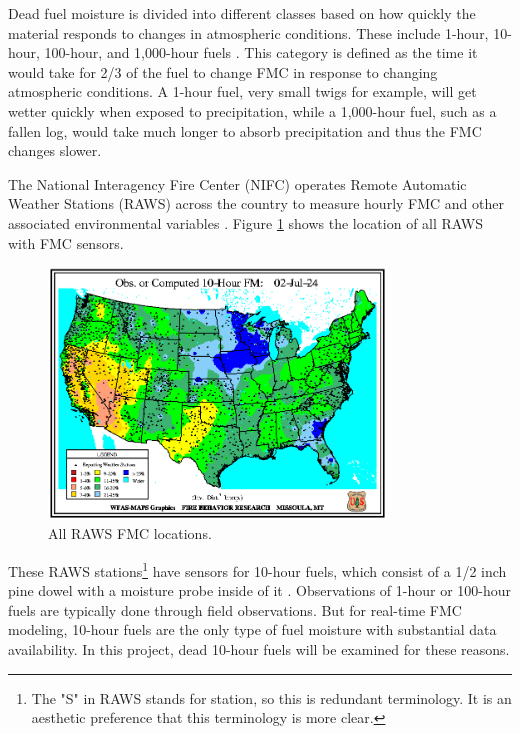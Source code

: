 \documentclass[11pt]{article}%
\begin{document}
Dead fuel moisture is divided into different classes based on how quickly the material responds to changes in atmospheric conditions. These include 1-hour, 10-hour, 100-hour, and 1,000-hour fuels \cite{NCEI-2024-DFM}. This category is defined as the time it would take for 2/3 of the fuel to change FMC in response to changing atmospheric conditions. A 1-hour fuel, very small twigs for example, will get wetter quickly when exposed to precipitation, while a 1,000-hour fuel, such as a fallen log, would take much longer to absorb precipitation and thus the FMC changes slower. 

The National Interagency Fire Center (NIFC) operates Remote Automatic Weather Stations (RAWS) across the country to measure hourly FMC and other associated environmental variables \cite{NIFC}. Figure \ref{fig:wfas_raws} shows the location of all RAWS with FMC sensors.

\begin{figure}[ht]
    \centering
    \includegraphics[width=0.8\textwidth]{images/WFAS-RAWS-map.png}
    \caption{All RAWS FMC locations.}
    \label{fig:wfas_raws}
\end{figure}

These RAWS stations\footnote{The "S" in RAWS stands for station, so this is redundant terminology. It is an aesthetic preference that this terminology is more clear.} have sensors for 10-hour fuels, which consist of a 1/2 inch pine dowel with a moisture probe inside of it \cite{cs_10h}. Observations of 1-hour or 100-hour fuels are typically done through field observations. But for real-time FMC modeling, 10-hour fuels are the only type of fuel moisture with substantial data availability. In this project, dead 10-hour fuels will be examined for these reasons.
\end{document}
